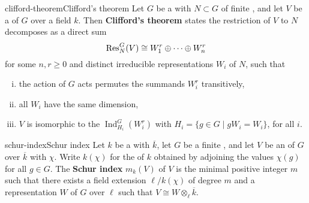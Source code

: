 \begin{topic}{clifford-theorem}{Clifford's theorem}
    Let $G$ be a  with  $N \subset G$ of finite , and let $V$ be a   of $G$ over a field $k$. Then \textbf{Clifford's theorem} states the restriction of $V$ to $N$ decomposes as a direct sum
    \[ \textup{Res}^G_N(V) \cong W_1^r \oplus \cdots \oplus W_n^r \]
    for some $n, r \ge 0$ and distinct irreducible representations $W_i$ of $N$, such that
    \begin{enumerate}[(i)]
        \item the action of $G$ acts permutes the summands $W_i^r$ transitively,
        \item all $W_i$ have the same dimension,
        \item $V$ is isomorphic to the  $\operatorname{Ind}_{H_i}^G(W_i^r)$ with $H_i = \{ g \in G \mid g W_i = W_i \}$, for all $i$.
    \end{enumerate}
\end{topic}

\begin{topic}{schur-index}{Schur index}
    Let $k$ be a  with  $\overline{k}$, let $G$ be a finite , and let $V$ be an  of $G$ over $\overline{k}$ with  $\chi$. Write $k(\chi)$ for the  of $k$ obtained by adjoining the values $\chi(g)$ for all $g \in G$.
    The \textbf{Schur index} $m_k(V)$ of $V$ is the minimal positive integer $m$ such that there exists a field extension $\ell / k(\chi)$ of degree $m$ and a representation $W$ of $G$ over $\ell$ such that $V \cong W \otimes_\ell \overline{k}$.
\end{topic}

